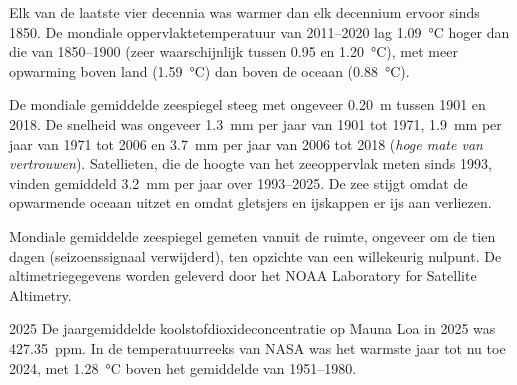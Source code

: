 \begin{proposition}\label{prop:g12:climate-change:warming}
Elk van de laatste vier decennia was warmer dan elk decennium ervoor
sinds 1850. De mondiale oppervlaktetemperatuur van 2011--2020 lag \qty{1.09}{\degreeCelsius}
hoger dan die van 1850--1900 (zeer waarschijnlijk tussen 0.95 en
\qty{1.20}{\degreeCelsius}), met meer opwarming boven land
(\qty{1.59}{\degreeCelsius}) dan boven de oceaan (\qty{0.88}{\degreeCelsius}).
\end{proposition}

\begin{proposition}\label{prop:g12:climate-change:sea}
De mondiale gemiddelde zeespiegel steeg met ongeveer \qty{0.20}{m} tussen 1901 en 2018.
De snelheid was ongeveer \qty{1.3}{mm} per jaar van 1901 tot 1971,
\qty{1.9}{mm} per jaar van 1971 tot 2006 en \qty{3.7}{mm} per jaar van
2006 tot 2018 (\emph{hoge mate van vertrouwen}). Satellieten, die de hoogte van
het zeeoppervlak meten sinds 1993, vinden gemiddeld \qty{3.2}{mm} per jaar over
1993--2025. De zee stijgt omdat de opwarmende oceaan uitzet en omdat
gletsjers en ijskappen er ijs aan verliezen.
\end{proposition}

\begin{omfigure}

{\small Mondiale gemiddelde zeespiegel gemeten vanuit de ruimte, ongeveer om de tien dagen
(seizoenssignaal verwijderd), ten opzichte van een willekeurig nulpunt. De altimetriegegevens
worden geleverd door het NOAA Laboratory for Satellite Altimetry.}
\end{omfigure}

\begin{dated}{2025}
De jaargemiddelde koolstofdioxideconcentratie op Mauna Loa in 2025 was
\qty{427.35}{ppm}. In de temperatuurreeks van NASA was het warmste jaar tot nu toe
2024, met \qty{1.28}{\degreeCelsius} boven het gemiddelde van 1951--1980.
\end{dated}

